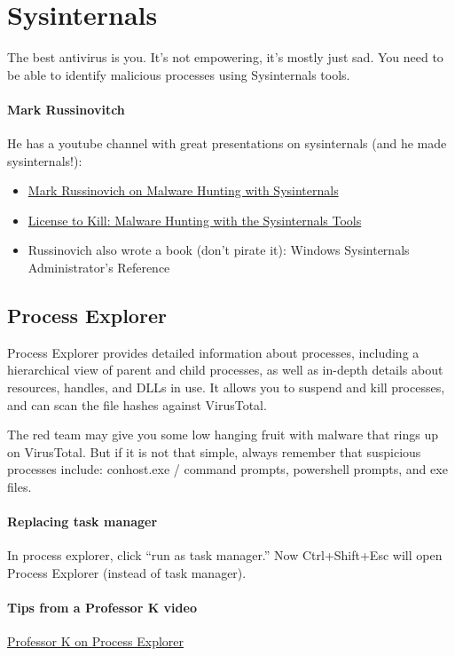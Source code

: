 \documentclass{article}
\begin{document}
\section{Sysinternals}
The best antivirus is you. It's not empowering, it's mostly just sad.
You need to be able to identify malicious processes using Sysinternals tools.

\paragraph{Mark Russinovitch} He has a youtube channel with great presentations on sysinternals (and he made sysinternals!): 
\begin{itemize}
\item \href{https://youtu.be/vW8eAqZyWeo}{Mark Russinovich on Malware Hunting with Sysinternals}
\item \href{https://youtu.be/A_TPZxuTzBU}{License to Kill: Malware Hunting with the Sysinternals Tools }
\item Russinovich also wrote a book (don't pirate it): Windows Sysinternals Administrator’s Reference
\end{itemize}

\subsection{Process Explorer}
Process Explorer provides detailed information about processes, including a hierarchical view of parent 
and child processes, as well as in-depth details about resources, handles, and DLLs in use.
It allows you to suspend and kill processes, and can scan the file hashes against VirusTotal.

The red team may give you some low hanging fruit with malware that rings up on VirusTotal.
But if it is not that simple, always remember that suspicious processes include:
conhost.exe / command prompts,
powershell prompts,
and exe files.

\paragraph{Replacing task manager}
In process explorer, click ``run as task manager.'' Now Ctrl+Shift+Esc will open Process Explorer (instead of task manager).

\paragraph{Tips from a Professor K video}
\href{https://youtu.be/y2bNLCWHFNs}{Professor K on Process Explorer}
\end{document}
